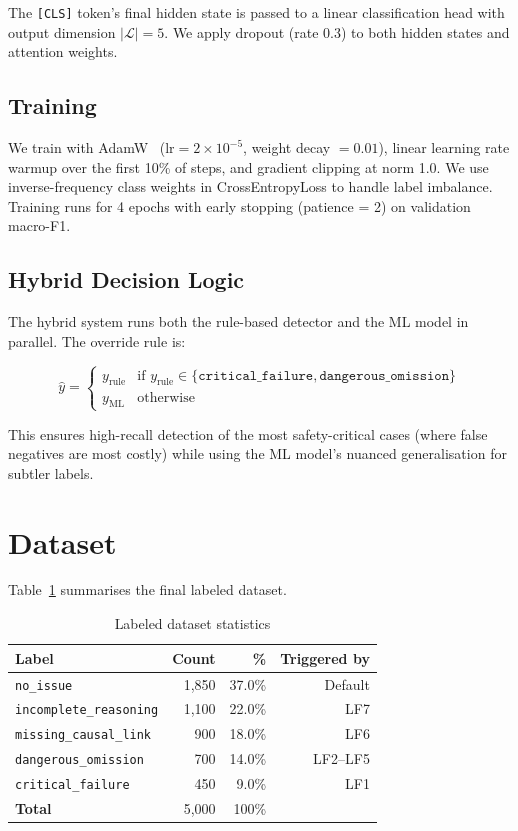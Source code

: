\documentclass[11pt,a4paper]{article}
\begin{document}
The \texttt{[CLS]} token's final hidden state is passed to a linear classification head with output dimension $|\mathcal{L}| = 5$. We apply dropout (rate 0.3) to both hidden states and attention weights.

\subsection{Training}

We train with AdamW~\citep{loshchilov2019} ($\text{lr} = 2 \times 10^{-5}$, weight decay $= 0.01$), linear learning rate warmup over the first 10\% of steps, and gradient clipping at norm 1.0. We use inverse-frequency class weights in CrossEntropyLoss to handle label imbalance. Training runs for 4 epochs with early stopping (patience = 2) on validation macro-F1.

\subsection{Hybrid Decision Logic}

The hybrid system runs both the rule-based detector and the ML model in parallel. The override rule is:

\[
\hat{y} = \begin{cases}
y_{\text{rule}} & \text{if } y_{\text{rule}} \in \{\texttt{critical\_failure}, \texttt{dangerous\_omission}\} \\
y_{\text{ML}}   & \text{otherwise}
\end{cases}
\]

This ensures high-recall detection of the most safety-critical cases (where false negatives are most costly) while using the ML model's nuanced generalisation for subtler labels.

\section{Dataset}
\label{sec:data}

Table~\ref{tab:data_stats} summarises the final labeled dataset.

\begin{table}[h]
\centering
\caption{Labeled dataset statistics}
\label{tab:data_stats}
\begin{tabular}{lrrr}
\toprule
\textbf{Label} & \textbf{Count} & \textbf{\%} & \textbf{Triggered by} \\
\midrule
\texttt{no\_issue}             & 1{,}850 & 37.0\% & Default \\
\texttt{incomplete\_reasoning} & 1{,}100 & 22.0\% & LF7 \\
\texttt{missing\_causal\_link} &   900  & 18.0\% & LF6 \\
\texttt{dangerous\_omission}   &   700  & 14.0\% & LF2–LF5 \\
\texttt{critical\_failure}     &   450  &  9.0\% & LF1 \\
\midrule
\textbf{Total}                 & 5{,}000 & 100\% & \\
\bottomrule
\end{tabular}
\end{table}
\end{document}
